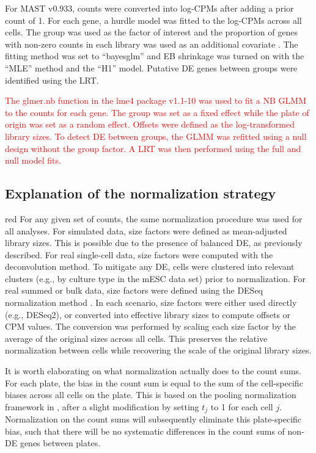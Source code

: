 \documentclass{article}
\newcommand\revised[1]{\textcolor{red}{#1}}
\begin{document}
For MAST v0.933, counts were converted into log-CPMs after adding a prior count of 1.
For each gene, a hurdle model was fitted to the log-CPMs across all cells. 
The group was used as the factor of interest and the proportion of genes with non-zero counts in each library was used as an additional covariate \citep{finak2015mast}.
The fitting method was set to ``bayesglm'' and EB shrinkage was turned on with the ``MLE'' method and the ``H1'' model.
Putative DE genes between groups were identified using the LRT.

\revised{The glmer.nb function in the lme4 package v1.1-10 was used to fit a NB GLMM to the counts for each gene.
The group was set as a fixed effect while the plate of origin was set as a random effect.
Offsets were defined as the log-transformed library sizes.
To detect DE between groups, the GLMM was refitted using a null design without the group factor.
A LRT was then performed using the full and null model fits.}

\subsection{Explanation of the normalization strategy}
\begin{color}{red}
For any given set of counts, the same normalization procedure was used for all analyses.
For simulated data, size factors were defined as mean-adjusted library sizes.
This is possible due to the presence of balanced DE, as previously described.
For real single-cell data, size factors were computed with the deconvolution method.
To mitigate any DE, cells were clustered into relevant clusters (e.g., by culture type in the mESC data set) prior to normalization.
For real summed or bulk data, size factors were defined using the DESeq normalization method \citep{anders2010differential}.
In each scenario, size factors were either used directly (e.g., DESeq2), or converted into effective library sizes to compute offsets or CPM values.
The conversion was performed by scaling each size factor by the average of the original sizes across all cells.
This preserves the relative normalization between cells while recovering the scale of the original library sizes.

It is worth elaborating on what normalization actually does to the count sums.
For each plate, the bias in the count sum is equal to the sum of the cell-specific biases across all cells on the plate.
This is based on the pooling normalization framework in \cite{lun2016pooling}, after a slight modification by setting $t_j$ to 1 for each cell $j$.
Normalization on the count sums will subsequently eliminate this plate-specific bias, such that there will be no systematic differences in the count sums of non-DE genes between plates.
\end{color}
\end{document}
